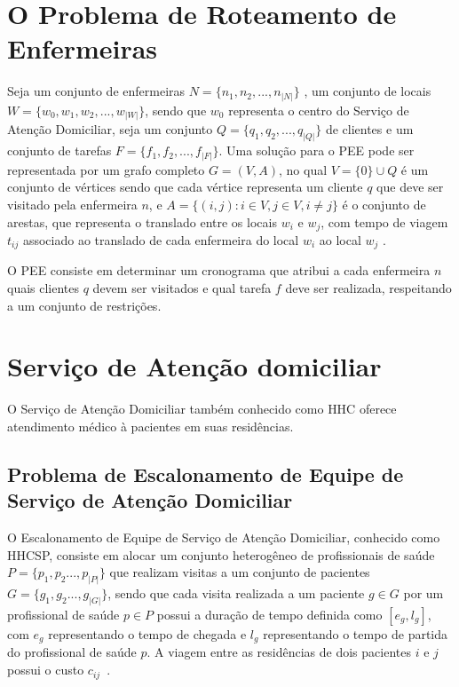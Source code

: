 \section{O Problema de Roteamento de Enfermeiras}

Seja um conjunto de enfermeiras $N = \{n_1, n_2, ..., n_{|N|}\}$ , um conjunto de locais $W = \{w_0, w_1, w_2, ..., w_{|W|}\}$, sendo que $w_0$ representa o centro do Serviço de Atenção Domiciliar, seja um conjunto $Q = \{q_1, q_2, ..., q_{|Q|}\}$ de clientes e um conjunto de tarefas $F = \{ f_1, f_2, ..., f_{|F|}\}$.  
Uma solução para o \ac{PEE} pode ser representada por um grafo completo $G = (V, A)$, no qual $V = \{0\} \cup Q$ é um conjunto de vértices sendo que cada vértice representa um cliente $q$ que deve ser visitado pela enfermeira $n$, e $A = \{ (i,j): i \in V, j \in V, i \neq j \}$ é o conjunto de arestas, que representa o translado entre os locais $w_i$ e $w_j$, com tempo de viagem $t_{ij}$ associado ao translado de cada enfermeira do local $w_i$ ao local $w_j$ \cite{mansini:2016}.

O \ac{PEE} consiste em determinar um cronograma que atribui a cada enfermeira $n$ quais clientes $q$ devem ser visitados e qual tarefa $f$ deve ser realizada, respeitando a um conjunto de restrições\cite{mansini:2016}.

\section{Serviço de Atenção domiciliar}

O Serviço de Atenção Domiciliar também conhecido como \ac{HHC} oferece atendimento médico à pacientes em suas residências. 

\subsection{Problema de Escalonamento de Equipe de Serviço de Atenção Domiciliar}

O Escalonamento de Equipe de Serviço de Atenção Domiciliar, conhecido como \ac{HHCSP}, consiste em alocar um conjunto heterogêneo de profissionais de saúde $P = \{ p_1, p_2 ..., p_{|P|} \}$  que realizam visitas a um conjunto de pacientes  $G = \{ g_1, g_2 ..., g_{|G|} \}$, sendo que cada visita realizada a um paciente $g \in G$ por um profissional de saúde $p \in P$ possui a duração de tempo definida como $[e_{g}, l_{g}]$, com $e_{g}$ representando o tempo de chegada e $l_{g}$ representando o tempo de partida do profissional de saúde $p$. A viagem entre as residências de dois pacientes $i$ e $j$  possui o custo $c_{ij}$~\cite{rasmussenm:2012}.   

